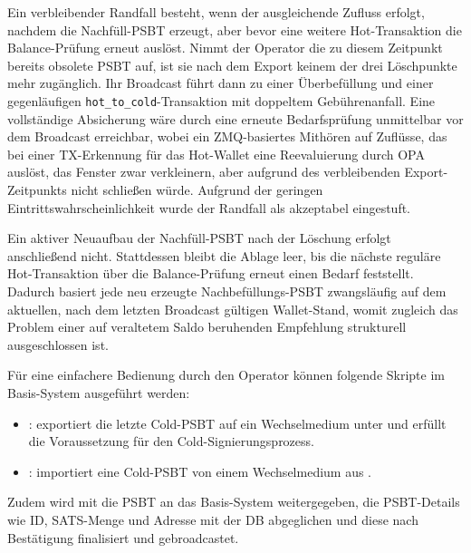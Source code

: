 Ein verbleibender Randfall besteht, wenn der ausgleichende Zufluss erfolgt, nachdem die Nachfüll-\ac{PSBT} erzeugt, aber bevor eine weitere Hot-Transaktion die Balance-Prüfung erneut auslöst. Nimmt der Operator die zu diesem Zeitpunkt bereits obsolete \ac{PSBT} auf, ist sie nach dem Export keinem der drei Löschpunkte mehr zugänglich. Ihr Broadcast führt dann zu einer Überbefüllung und einer gegenläufigen \texttt{hot\_to\_cold}-Transaktion mit doppeltem Gebührenanfall. Eine vollständige Absicherung wäre durch eine erneute Bedarfsprüfung unmittelbar vor dem Broadcast erreichbar, wobei ein \ac{ZMQ}-basiertes Mithören auf Zuflüsse, das bei einer \ac{TX}-Erkennung für das Hot-Wallet eine Reevaluierung durch \ac{OPA} auslöst, das Fenster zwar verkleinern, aber aufgrund des verbleibenden Export-Zeitpunkts nicht schließen würde. Aufgrund der geringen Eintrittswahrscheinlichkeit wurde der Randfall als akzeptabel eingestuft.

Ein aktiver Neuaufbau der Nachfüll-\ac{PSBT} nach der Löschung erfolgt anschließend nicht. Stattdessen bleibt die Ablage leer, bis die nächste reguläre Hot-Transaktion über die Balance-Prüfung erneut einen Bedarf feststellt. Dadurch basiert jede neu erzeugte Nachbefüllungs-\ac{PSBT} zwangsläufig auf dem aktuellen, nach dem letzten Broadcast gültigen Wallet-Stand, womit zugleich das Problem einer auf veraltetem Saldo beruhenden Empfehlung strukturell ausgeschlossen ist.

Für eine einfachere Bedienung durch den Operator können folgende Skripte im Basis-System ausgeführt werden:
\begin{itemize}
    \item {}: exportiert die letzte Cold-\ac{PSBT} auf ein Wechselmedium unter  und erfüllt die Voraussetzung für den Cold-Signierungsprozess.
    \item {}: importiert eine Cold-\ac{PSBT} von einem Wechselmedium aus .
\end{itemize}

Zudem wird mit  die \ac{PSBT} an das Basis-System weitergegeben, die \ac{PSBT}-Details wie \ac{ID}, \ac{SATS}-Menge und Adresse mit der \ac{DB} abgeglichen und diese nach Bestätigung finalisiert und gebroadcastet.

